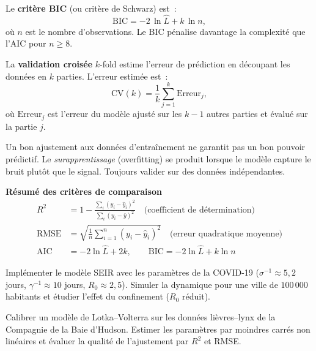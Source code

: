 \begin{definition}
Le \textbf{crit\`ere BIC} (ou crit\`ere de Schwarz) est~:
\[
  \text{BIC} = -2\,\ln \hat{L} + k\,\ln n,
\]
o\`u $n$ est le nombre d'observations. Le BIC p\'enalise davantage la
complexit\'e que l'AIC pour $n \geq 8$.
\end{definition}

\begin{proposition}
La \textbf{validation crois\'ee} $k$-fold estime l'erreur de pr\'ediction
en d\'ecoupant les donn\'ees en $k$ parties. L'erreur estim\'ee est~:
\[
  \text{CV}(k) = \frac{1}{k} \sum_{j=1}^k \text{Erreur}_j,
\]
o\`u $\text{Erreur}_j$ est l'erreur du mod\`ele ajust\'e sur les $k-1$
autres parties et \'evalu\'e sur la partie $j$.
\end{proposition}

\begin{attention}
Un bon ajustement aux donn\'ees d'entra\^inement ne garantit pas un bon
pouvoir pr\'edictif. Le \emph{surapprentissage}
(overfitting) se produit lorsque le mod\`ele capture le bruit plut\^ot
que le signal. Toujours valider sur des donn\'ees ind\'ependantes.
\end{attention}

\begin{formules}
\textbf{R\'esum\'e des crit\`eres de comparaison}
\begin{align*}
  R^2 &= 1 - \frac{\sum_i (y_i - \hat{y}_i)^2}{\sum_i (y_i - \bar{y})^2}
    \quad \text{(coefficient de d\'etermination)} \\[4pt]
  \text{RMSE} &= \sqrt{\frac{1}{n}\sum_{i=1}^n (y_i - \hat{y}_i)^2}
    \quad \text{(erreur quadratique moyenne)} \\[4pt]
  \text{AIC} &= -2\ln\hat{L} + 2k, \qquad
  \text{BIC} = -2\ln\hat{L} + k\ln n
\end{align*}
\end{formules}

\begin{exercice}
Impl\'ementer le mod\`ele SEIR avec les param\`etres de la COVID-19
($\sigma^{-1} \approx 5{,}2$ jours, $\gamma^{-1} \approx 10$ jours,
$R_0 \approx 2{,}5$). Simuler la dynamique pour une ville de
$100\,000$ habitants et \'etudier l'effet du confinement ($R_0$ r\'eduit).
\end{exercice}

\begin{exercice}
Calibrer un mod\`ele de Lotka--Volterra sur les donn\'ees
li\`evres--lynx de la Compagnie de la Baie d'Hudson. Estimer
les param\`etres par moindres carr\'es non lin\'eaires et \'evaluer
la qualit\'e de l'ajustement par $R^2$ et RMSE.
\end{exercice}


